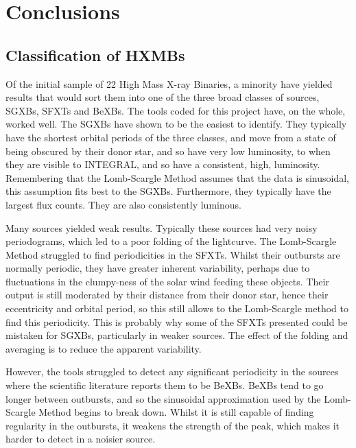 
\chapter{Conclusions} %

\label{ch:Conclusions} %


\section{Classification of HXMBs}
Of the initial sample of 22 High Mass X-ray Binaries, a minority have yielded results that would sort them into one of the three broad classes of sources, SGXBs, SFXTs and BeXBs. The tools coded for this project have, on the whole, worked well. The SGXBs have shown to be the easiest to identify. They typically have the shortest orbital periods of the three classes, and move from a state of being obscured by their donor star, and so have very low luminosity, to when they are visible to INTEGRAL, and so have a consistent, high, luminosity. Remembering that the Lomb-Scargle Method assumes that the data is sinusoidal, this assumption fits best to the SGXBs. Furthermore, they typically have the largest flux counts. They are also consistently luminous.

Many sources yielded weak results. Typically these sources had very noisy periodograms, which led to a poor folding of the lightcurve. The Lomb-Scargle Method struggled to find periodicities in the SFXTs. Whilst their outbursts are normally periodic, they have greater inherent variability, perhaps due to fluctuations in the clumpy-ness of the solar wind feeding these objects. Their output is still moderated by their distance from their donor star, hence their eccentricity and orbital period, so this still allows to the Lomb-Scargle method to find this periodicity. This is probably why some of the SFXTs presented could be mistaken for SGXBs, particularly in weaker sources. The effect of the folding and averaging is to reduce the apparent variability. 

However, the tools struggled to detect any significant periodicity in the sources where the scientific literature reports them to be BeXBs. BeXBs tend to go longer between outbursts, and so the sinusoidal approximation used by the Lomb-Scargle Method begins to break down. Whilst it is still capable of finding regularity in the outbursts, it weakens the strength of the peak, which makes it harder to detect in a noisier source. 

